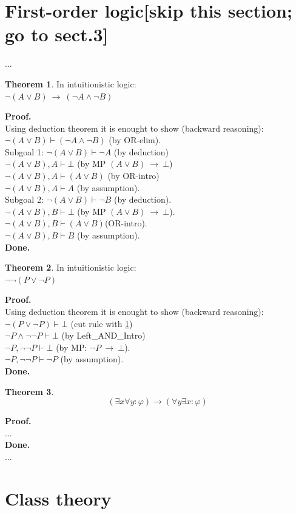 \documentclass[10pt,a4paper]{article}
\theoremstyle{definition}
\newtheorem{constructor}{Constructor}[section]
\newtheorem{theorem}{Theorem}[section]
\newcommand{\Done}{\noindent \textbf{Done.}\\}
\renewcommand{\implies}{\ \longrightarrow\ }
\newcommand{\Proof}{\noindent \textbf{Proof.}\\}
\begin{document}
\section{First-order logic[skip this section; go to sect.3]}
...
\begin{theorem}
\label{thm:ILMorgan}
In intuitionistic logic:\\
$\neg (A\lor B) \implies (\neg A\land\neg B)$
\end{theorem}
\Proof
Using deduction theorem it is enought to show (backward reasoning):\\
$\neg (A\lor B) \vdash (\neg A\land\neg B)$ (by OR-elim).\\
Subgoal 1: $\neg (A\lor B) \vdash \neg A$ (by deduction)\\
$\neg (A\lor B), A \vdash \bot$ (by MP $(A\lor B)\implies\bot$)\\
$\neg (A\lor B), A \vdash (A\lor B)$ (by OR-intro)\\
$\neg (A\lor B), A \vdash A$ (by assumption).\\
Subgoal 2: $\neg (A\lor B) \vdash \neg B$ (by deduction).\\
$\neg (A\lor B), B \vdash \bot$ (by MP $(A\lor B)\implies\bot$).\\
$\neg (A\lor B), B \vdash (A\lor B)$(OR-intro).\\
$\neg (A\lor B), B \vdash B$ (by assumption).\\
\Done

\begin{theorem} In intuitionistic logic:\\
\label{double neg LEM}
$\neg\neg (P\lor\neg P)$
\end{theorem}
\Proof
Using deduction theorem it is enought to show (backward reasoning):\\
$\neg (P\lor\neg P) \vdash \bot$ (cut rule with \ref{thm:ILMorgan})\\
$\neg P\land\neg\neg P \vdash \bot$ (by Left\_AND\_Intro)\\
$\neg P, \neg\neg P \vdash \bot$ (by MP: $\neg P \implies \bot$).\\
$\neg P, \neg\neg P \vdash \neg P$ (by assumption).\\
\Done

\begin{theorem}
\[
(\exists x \forall y:\varphi) \longrightarrow (\forall y \exists x :\varphi)
\]
\end{theorem}
\Proof
...\\
\Done
...
\pagebreak
\section{Class theory}%
\end{document}
